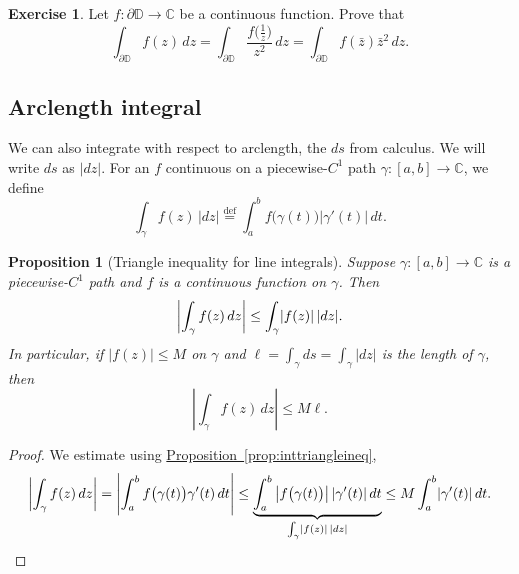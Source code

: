 \documentclass[12pt,openany]{book}
\newcommand{\avoidbreak}{\postdisplaypenalty=100}
\newcommand{\sabs}[1]{\lvert {#1} \rvert}
\newcommand{\abs}[1]{\left\lvert {#1} \right\rvert}
\newcommand{\C}{{\mathbb{C}}}
\newcommand{\D}{{\mathbb{D}}}
\theoremstyle{plain}
\newtheorem{prop}[thm]{Proposition}
\theoremstyle{remark}
\theoremstyle{definition}
\newenvironment{exbox}{%
    \def\FrameCommand{\vrule width 1pt \relax\hspace{10pt}}%
    \MakeFramed{\advance\hsize-\width\FrameRestore}%
}{%
    \endMakeFramed
}
\theoremstyle{exercise}
\newtheorem{exercise}{Exercise}[section]
\theoremstyle{example}
\newcommand{\propref}[1]{\hyperref[#1]{Proposition~\ref*{#1}}}
\begin{document}
\begin{exbox}
\begin{exercise}
Let $f \colon \partial \D \to \C$ be a continuous function.  Prove that
\begin{equation*}
\int_{\partial \D} f(z) \, dz
=
\int_{\partial \D} \frac{f\bigl(\frac{1}{z}\bigr)}{z^2} \, dz
=
\int_{\partial \D} f(\bar{z}) \bar{z}^2 \, dz .
\end{equation*}
\end{exercise}
\end{exbox}

\subsection{Arclength integral}

We can also integrate with respect to arclength, the $ds$ from calculus.
We will write $ds$ as $\sabs{dz}$.  For an $f$ continuous on
a piecewise-$C^1$ path $\gamma \colon [a,b] \to \C$,
we define
\begin{equation*}
\int_\gamma f(z) \, \sabs{dz}
\overset{\text{def}}{=}
\int_a^b f\bigl( \gamma(t) \bigr) \sabs{\gamma'(t)} \, dt .
\end{equation*}


\begin{prop}[Triangle inequality for line integrals]%
Suppose $\gamma \colon [a,b] \to \C$ is 
a piecewise-$C^1$ path and $f$ is a continuous function on
$\gamma$.  Then
\begin{equation*}
\abs{\int_\gamma f(z) \, dz} \leq \int_\gamma \sabs{f(z)} \, \sabs{dz} .
\avoidbreak
\end{equation*}
In particular, if $\sabs{f(z)} \leq M$ on $\gamma$ and $\ell = \int_\gamma ds
= \int_{\gamma} \sabs{dz}$ is the length of $\gamma$, then
\begin{equation*}
\abs{\int_\gamma f(z) \, dz} \leq M \ell .
\end{equation*}
\end{prop} 

\begin{proof}
We estimate using \propref{prop:inttriangleineq},
\begin{equation*}
\abs{\int_\gamma f(z) \, dz}
=
\abs{\int_a^b f\bigl( \gamma(t) \bigr) \gamma'(t) \, dt}
\leq
\underbrace{\int_a^b \abs{ f\bigl( \gamma(t) \bigr) }  \sabs{ \gamma'(t) }
\, dt}_{\int_\gamma \sabs{f(z)} \, \sabs{dz}}
\leq
M
\int_a^b \sabs{ \gamma'(t) } \, dt .
\qedhere
\end{equation*}
\end{proof}
\end{document}
